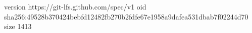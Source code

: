 version https://git-lfs.github.com/spec/v1
oid sha256:49528b370424bebfd12482fb270b2fdfe67e1958a9dafea531dbab7f02244d70
size 1413

